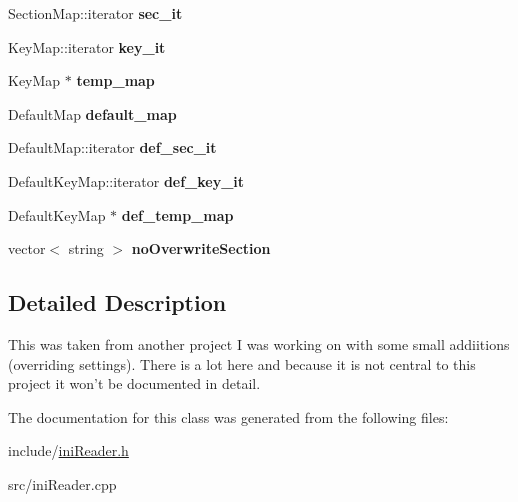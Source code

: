 \begin{DoxyCompactItemize}
\item 
\hypertarget{classINIReader_a5638d8cb18c22c1bfddf4386a5b46a7c}{\-Section\-Map\-::iterator {\bfseries sec\-\_\-it}}\label{d5/de4/classINIReader_a5638d8cb18c22c1bfddf4386a5b46a7c}

\item 
\hypertarget{classINIReader_a1855338827817c614b04e813c180fa0d}{\-Key\-Map\-::iterator {\bfseries key\-\_\-it}}\label{d5/de4/classINIReader_a1855338827817c614b04e813c180fa0d}

\item 
\hypertarget{classINIReader_a9ace5e2e7f7d3ad6d6cca77380c04a68}{\-Key\-Map $\ast$ {\bfseries temp\-\_\-map}}\label{d5/de4/classINIReader_a9ace5e2e7f7d3ad6d6cca77380c04a68}

\item 
\hypertarget{classINIReader_abd12de357de84a26239165d339810f59}{\-Default\-Map {\bfseries default\-\_\-map}}\label{d5/de4/classINIReader_abd12de357de84a26239165d339810f59}

\item 
\hypertarget{classINIReader_aeed306baf82ac107ffa12169736479a8}{\-Default\-Map\-::iterator {\bfseries def\-\_\-sec\-\_\-it}}\label{d5/de4/classINIReader_aeed306baf82ac107ffa12169736479a8}

\item 
\hypertarget{classINIReader_a237850e82c0b5399f8f4b413aa66fc47}{\-Default\-Key\-Map\-::iterator {\bfseries def\-\_\-key\-\_\-it}}\label{d5/de4/classINIReader_a237850e82c0b5399f8f4b413aa66fc47}

\item 
\hypertarget{classINIReader_ae473d5806ec3b95bc8a188439eb46a7d}{\-Default\-Key\-Map $\ast$ {\bfseries def\-\_\-temp\-\_\-map}}\label{d5/de4/classINIReader_ae473d5806ec3b95bc8a188439eb46a7d}

\item 
\hypertarget{classINIReader_a66bb49578e1fa17136ae5838a8a58c46}{vector$<$ string $>$ {\bfseries no\-Overwrite\-Section}}\label{d5/de4/classINIReader_a66bb49578e1fa17136ae5838a8a58c46}

\end{DoxyCompactItemize}


\subsection{\-Detailed \-Description}
\-This was taken from another project \-I was working on with some small addiitions (overriding settings). \-There is a lot here and because it is not central to this project it won't be documented in detail. 

\-The documentation for this class was generated from the following files\-:\begin{DoxyCompactItemize}
\item 
include/\hyperlink{iniReader_8h}{ini\-Reader.\-h}\item 
src/ini\-Reader.\-cpp\end{DoxyCompactItemize}
